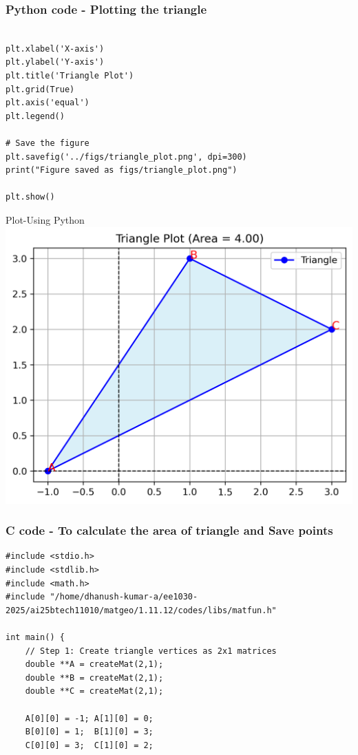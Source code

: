 \documentclass{beamer}
\begin{document}
\begin{frame}[fragile]                            
\frametitle{Python code - Plotting the triangle}                
\begin{lstlisting}

plt.xlabel('X-axis')
plt.ylabel('Y-axis')
plt.title('Triangle Plot')
plt.grid(True)
plt.axis('equal')
plt.legend()

# Save the figure
plt.savefig('../figs/triangle_plot.png', dpi=300)
print("Figure saved as figs/triangle_plot.png")

plt.show()

\end{lstlisting}
\end{frame}
\begin{frame}{Plot-Using  Python}
    \centering
    \includegraphics[width=\columnwidth, height=0.8\textheight, keepaspectratio]{../figs/triangle_plot.png}     
\end{frame}


\begin{frame}[fragile]                            
\frametitle{C code - To calculate the area of triangle and Save points}                
\begin{lstlisting}
#include <stdio.h>
#include <stdlib.h>
#include <math.h>
#include "/home/dhanush-kumar-a/ee1030-2025/ai25btech11010/matgeo/1.11.12/codes/libs/matfun.h"

int main() {
    // Step 1: Create triangle vertices as 2x1 matrices
    double **A = createMat(2,1);
    double **B = createMat(2,1);
    double **C = createMat(2,1);

    A[0][0] = -1; A[1][0] = 0;
    B[0][0] = 1;  B[1][0] = 3;
    C[0][0] = 3;  C[1][0] = 2;
    \end{lstlisting}

\end{frame}
\end{document}
